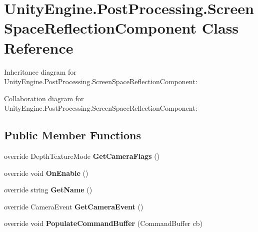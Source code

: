 \hypertarget{class_unity_engine_1_1_post_processing_1_1_screen_space_reflection_component}{}\section{Unity\+Engine.\+Post\+Processing.\+Screen\+Space\+Reflection\+Component Class Reference}
\label{class_unity_engine_1_1_post_processing_1_1_screen_space_reflection_component}


Inheritance diagram for Unity\+Engine.\+Post\+Processing.\+Screen\+Space\+Reflection\+Component\+:


Collaboration diagram for Unity\+Engine.\+Post\+Processing.\+Screen\+Space\+Reflection\+Component\+:
\subsection*{Public Member Functions}
\begin{DoxyCompactItemize}
\item 
\mbox{\label{class_unity_engine_1_1_post_processing_1_1_screen_space_reflection_component_aeaa198759ea4fae9a6ee5feac84730fa}} 
override Depth\+Texture\+Mode {\bfseries Get\+Camera\+Flags} ()
\item 
\mbox{\label{class_unity_engine_1_1_post_processing_1_1_screen_space_reflection_component_a0d58b4de3e36450e06df20a4de6bd84c}} 
override void {\bfseries On\+Enable} ()
\item 
\mbox{\label{class_unity_engine_1_1_post_processing_1_1_screen_space_reflection_component_ad4da13965c3b67798e594134f70505e3}} 
override string {\bfseries Get\+Name} ()
\item 
\mbox{\label{class_unity_engine_1_1_post_processing_1_1_screen_space_reflection_component_a696726c8892304b37695a69c900b2b97}} 
override Camera\+Event {\bfseries Get\+Camera\+Event} ()
\item 
\mbox{\label{class_unity_engine_1_1_post_processing_1_1_screen_space_reflection_component_a816b26c983d2e6b8723a049dafa72544}} 
override void {\bfseries Populate\+Command\+Buffer} (Command\+Buffer cb)
\end{DoxyCompactItemize}
